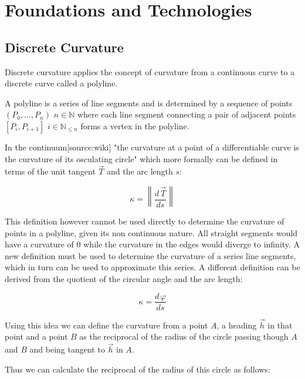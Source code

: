 

\graphicspath{{Chapter/Figs/basics/}}
\chapter{Foundations and Technologies}
\label{chap:basics}

\section{Discrete Curvature}
Discrete curvature applies the concept of curvature from a continuous curve to a discrete curve called a polyline.

\vskip 0.2in

A polyline is a series of line segments and is determined by a sequence of points $(P_0,...,P_n)$ $n \in \mathbb{N}$ where each line segment connecting a pair of adjacent points $[P_i,P_{i+1}]$ $i \in \mathbb{N}_{\le n}$ forms a vertex in the polyline.

\vskip 0.2in

In the continuum[source:wiki] "the curvature at a point of a differentiable curve is the curvature of its osculating circle"  which more formally can be defined in terms of the unit tangent $\vec T$ and the arc length $s$: \cite{CurvatureDefinition}

$$\kappa  = \left\| {\frac{{d\,\vec T}}{{ds}}} \right\|$$

This definition however cannot be used directly to determine the curvature of points in a polyline, given its non continuous nature. All straight segments would have a curvature of $0$ while the curvature in the edges would diverge to infinity. A new definition must be used to determine the curvature of a series line segments, which in turn can be used to approximate this series. A different definition can be derived from the quotient of the circular angle and the arc length:

$$\kappa  =  {\frac{{d\,\varphi}}{{ds}}}$$

Using this idea we can define the curvature from a point $A$, a heading  $\vec h$ in that point and a point $B$ as the reciprocal of the radius of the circle passing though $A$ and $B$ and being tangent to  $\vec h$ in $A$.


Thus we can calculate the reciprocal of the radius of this circle as follows:

